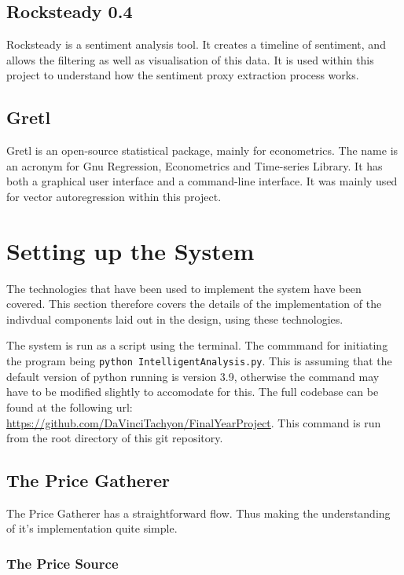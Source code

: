 \subsection{Rocksteady 0.4}

Rocksteady is a sentiment analysis tool. It creates a timeline of sentiment, and allows the filtering as well as visualisation of this data. It is used within this project to understand how the sentiment proxy extraction process works.

\subsection{Gretl}

Gretl is an open-source statistical package, mainly for econometrics. The name is an acronym for Gnu Regression, Econometrics and Time-series Library. It has both a graphical user interface and a command-line interface. It was mainly used for vector autoregression within this project.

\section{Setting up the System}

The technologies that have been used to implement the system have been covered. This section therefore covers the details of the implementation of the indivdual components laid out in the design, using these technologies.

The system is run as a script using the terminal. The commmand for initiating the program being \verb|python IntelligentAnalysis.py|. This is assuming that the default version of python running is version 3.9, otherwise the command may have to be modified slightly to accomodate for this. The full codebase can be found at the following url: \url{https://github.com/DaVinciTachyon/FinalYearProject}. This command is run from the root directory of this git repository.

\subsection{The Price Gatherer}

The Price Gatherer has a straightforward flow. Thus making the understanding of it's implementation quite simple.

\subsubsection{The Price Source}

